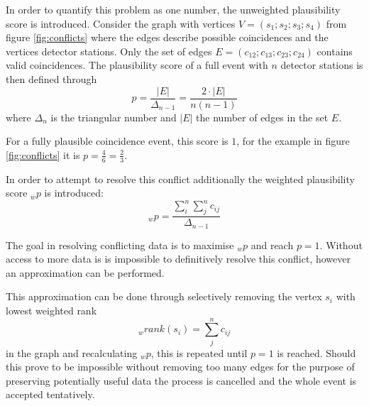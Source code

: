 \documentclass[abstract,toc,los,lof,english,10pt,glossary,acronyms]{jluthesis}
\begin{document}
In order to quantify this problem as one number, the unweighted plausibility score is introduced. Consider the graph with vertices $V = (s_1; s_2; s_3; s_4)$ from figure \ref{fig:conflicts} where the edges describe possible coincidences and the vertices detector stations. Only the set of edges $E = (c_{12}; c_{13}; c_{23}; c_{24})$ contains valid coincidences. The plausibility score of a full event with $n$ detector stations is then defined through
\begin{equation}
p = \frac{|E|}{\Delta_{n-1}}=\frac{2\cdot|E|}{n(n-1)}
\end{equation}
where $\Delta_n$ is the triangular number and $|E|$ the number of edges in the set $E$.

For a fully plausible coincidence event, this score is $1$, for the example in figure \ref{fig:conflicts} it is $p = \frac{4}{6}=\frac{2}{3}$.

In order to attempt to resolve this conflict additionally the weighted plausibility score $_wp$ is introduced:
\begin{equation}
	_wp = \frac{\sum^{n}_{i}\sum^{n}_{j} c_{ij}}{\Delta_{n-1}}
\end{equation}

The goal in resolving conflicting data is to maximise $_wp$ and reach $p=1$. Without access to more data is is impossible to definitively resolve this conflict, however an approximation can be performed.

This approximation can be done through selectively removing the vertex $s_i$ with lowest weighted rank
\begin{equation}
_wrank(s_i) = \sum_{j}^{n}c_{ij}
\end{equation}
in the graph and recalculating $_wp$, this is repeated until $p=1$ is reached. Should this prove to be impossible without removing too many edges for the purpose of preserving potentially useful data the process is cancelled and the whole event is accepted tentatively.
\end{document}
